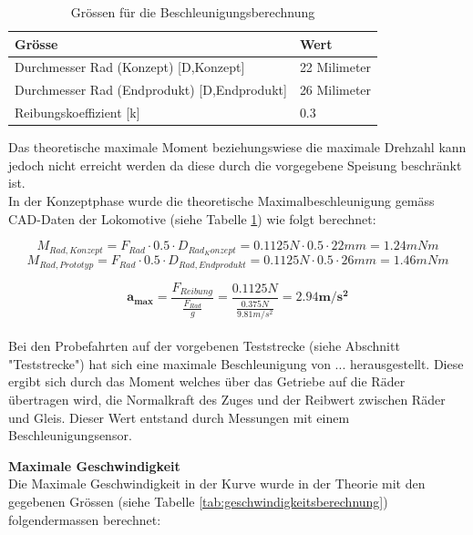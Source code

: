 \documentclass[../../main.tex]{subfiles}
\begin{document}
\begin{table}[H] \centering
  \begin{tabular}{|l|l|}
  \hline
  \textbf{Grösse} & \textbf{Wert}\\
  \hline
  Durchmesser Rad (Konzept) [D,Konzept]          & 22 Milimeter\\
   \hline
   Durchmesser Rad (Endprodukt) [D,Endprodukt]          & 26 Milimeter\\
   \hline
  Reibungskoeffizient [k]      & 0.3\\
  \hline
  \end{tabular}

  \caption{Grössen für die Beschleunigungsberechnung}
  \label{tab:groessen_beschleunigung}
  \end{table}

Das theoretische maximale Moment beziehungswiese die maximale Drehzahl kann jedoch nicht erreicht werden da diese durch die vorgegebene Speisung beschränkt ist.\\
In der Konzeptphase wurde die theoretische Maximalbeschleunigung gemäss CAD-Daten der Lokomotive (siehe Tabelle \ref{tab:groessen_beschleunigung}) wie folgt berechnet:

$$M_{Rad,Konzept}=F_{Rad} \cdot 0.5 \cdot D_{Rad_Konzept}= 0.1125N \cdot 0.5 \cdot 22mm = 1.24mNm$$
$$M_{Rad,Prototyp}=F_{Rad} \cdot 0.5 \cdot D_{Rad,Endprodukt}= 0.1125N \cdot 0.5 \cdot 26mm = 1.46mNm$$

$$\boldsymbol{a_{max}}=\frac{F_{Reibung}}{\frac{F_{Rad}}{g}}=\frac{0.1125N}{\frac{0.375N}{9.81m/s^2}}=\boldsymbol{2.94m/s^2}$$
\\

Bei den Probefahrten auf der vorgebenen Teststrecke (siehe Abschnitt "Teststrecke") hat sich eine maximale Beschleunigung von ... herausgestellt. Diese ergibt sich durch das Moment welches über das Getriebe auf die Räder übertragen wird, die Normalkraft des Zuges und der Reibwert zwischen Räder und Gleis. Dieser Wert entstand durch Messungen mit einem Beschleunigungsensor.\\

\newpage

\textbf{Maximale Geschwindigkeit}\\
Die Maximale Geschwindigkeit in der Kurve wurde in der Theorie mit den gegebenen Grössen (siehe Tabelle \ref{tab:geschwindigkeitsberechnung}) folgendermassen berechnet:\\
\end{document}
